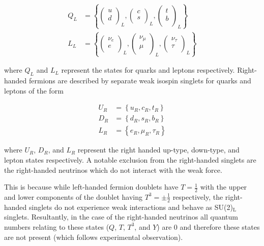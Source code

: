 \documentclass[12pt,a4paper,epsf,portrait,times,epsfig]{report}
\begin{document}
	\begin{align}
		Q_{L}&=\left\{\begin{pmatrix}
			u \\
			d \\
		\end{pmatrix}_{L},\begin{pmatrix}
			c \\
			s \\
		\end{pmatrix}_{L},\begin{pmatrix}
			t \\
			b \\
		\end{pmatrix}_{L}\right\} \\
		L_{L}&=\left\{\begin{pmatrix}
			\nu_{e} \\
			e \\
		\end{pmatrix}_{L},\begin{pmatrix}
			\nu_{\mu} \\
			\mu \\
		\end{pmatrix}_{L},\begin{pmatrix}
			\nu_{\tau} \\
			\tau \\
		\end{pmatrix}_{L}\right\}
	\end{align}

	where $Q_{L}$ and $L_{L}$ represent the states for quarks and leptons respectively. Right-handed fermions are described by separate weak isospin singlets for quarks and leptons of the form

	\begin{align}
		U_{R}&=\left\{u_{R},c_{R},t_{R}\right\} \\
		D_{R}&=\left\{d_{R},s_{R},b_{R}\right\} \\
		L_{R}&=\left\{e_{R},\mu_{R},\tau_{R}\right\}
	\end{align}

	where $U_{R}$, $D_{R}$, and $L_{R}$ represent the right handed up-type, down-type, and lepton states respectively. A notable exclusion from the right-handed singlets are the right-handed neutrinos which do not interact with the weak force. \par
	
	This is because while left-handed fermion doublets have $T=\frac{1}{2}$ with the upper and lower components of the doublet having $T^{3}=\pm\frac{1}{2}$ respectively, the right-handed singlets do not experience weak interactions and behave as SU(2)$_{\mathrm{L}}$ singlets. Resultantly, in the case of the right-handed neutrinos all quantum numbers relating to these states ($Q$, $T$, $T^{3}$, and $Y$) are 0 and therefore these states are not present (which follows experimental observation). \par
\end{document}

